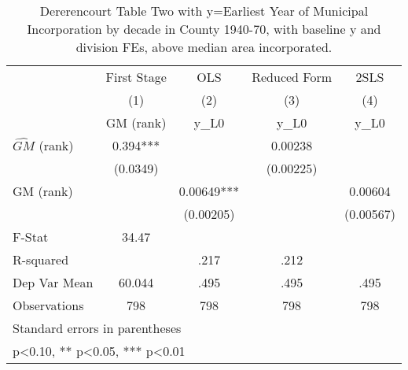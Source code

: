 \begin{table}[htbp]\centering
\def\sym#1{\ifmmode^{#1}\else\(^{#1}\)\fi}
\caption{Dererencourt Table Two with y=Earliest Year of Municipal Incorporation by decade in County 1940-70, with baseline y and division FEs, above median area incorporated.}
\begin{tabular}{l*{4}{c}}
\toprule
                    & First Stage   &         OLS   &Reduced Form   &        2SLS   \\
                    &\multicolumn{1}{c}{(1)}&\multicolumn{1}{c}{(2)}&\multicolumn{1}{c}{(3)}&\multicolumn{1}{c}{(4)}\\
                    &\multicolumn{1}{c}{GM  (rank)}&\multicolumn{1}{c}{y\_L0}&\multicolumn{1}{c}{y\_L0}&\multicolumn{1}{c}{y\_L0}\\
\midrule
$\hat{GM}$ (rank)   &       0.394***&               &     0.00238   &               \\
                    &    (0.0349)   &               &   (0.00225)   &               \\
\addlinespace
GM  (rank)          &               &     0.00649***&               &     0.00604   \\
                    &               &   (0.00205)   &               &   (0.00567)   \\
\midrule
F-Stat              &       34.47   &               &               &               \\
R-squared           &               &        .217   &        .212   &               \\
Dep Var Mean        &      60.044   &        .495   &        .495   &        .495   \\
Observations        &         798   &         798   &         798   &         798   \\
\bottomrule
\multicolumn{5}{l}{\footnotesize Standard errors in parentheses}\\
\multicolumn{5}{l}{\footnotesize * p<0.10, ** p<0.05, *** p<0.01}\\
\end{tabular}
\end{table}
